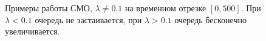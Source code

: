 \documentclass[12pt, a4paper]{article}
\begin{document}
\begin{figure}[H]
\caption{Примеры работы СМО, $\lambda\ne 0.1$ на временном отрезке $[0,500]$. При $\lambda<0.1$ очередь не застаивается, при $\lambda>0.1$ очередь бесконечно увеличивается.}
\end{figure}
\end{document}
